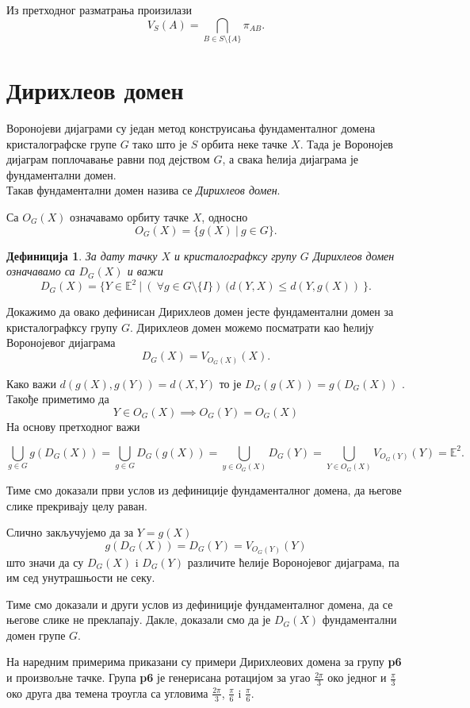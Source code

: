 \documentclass[12pt]{report}
\newtheorem{definition}[theorem]{\bf Дефиниција}
\begin{document}
Из претходног разматрања произилази
$$V_S(A) = \bigcap _{B \in S \setminus \{A\}} \pi_{AB}.$$ 

\section{Дирихлеов домен}

Воронојеви дијаграми су један метод конструисања фундаменталног домена кристалографске групе $G$ тако што је $S$ орбита неке тачке $X$. Тада је Воронојев дијаграм поплочавање равни под дејством $G$, а свака ћелија дијаграма је фундаментални домен. \\
Такав фундаментални домен назива се \emph{Дирихлеов домен}.

Са $O_G(X)$ означавамо орбиту тачке $X$, односно
$$O_G(X) = \{g(X)\:|\:g \in G\} .$$

\begin{definition}
За дату тачку $X$ и кристалографксу групу $G$ Дирихлеов домен означавамо са $D_G(X)$ и важи
$$D_G(X) = \{Y \in \mathbb{E}^2\:|\:(\:\forall g \in G \setminus \{I\})\:(d(Y,X)\leq d(Y,g(X))\:\}.$$
\end{definition}

\noindent  Докажимо да овако дефинисан Дирихлеов домен јесте фундаментални домен за кристалографксу групу $G$.
Дирихлеов домен можемо посматрати као ћелију Воронојевог дијаграма 
$$D_G(X)= V_{O_G(X)}(X).$$

\noindent Како важи $d(g(X), g(Y))= d(X,Y)$ то је  $D_G(g(X)) = g(D_G(X))$  .
Такође приметимо да $$Y \in  O_G(X) \implies O_G(Y) = O_G(X) $$
На основу претходног важи

$$\bigcup_{g\in G}g(D_G(X)) = \bigcup_{g\in G}D_G(g(X)) = \bigcup_{y \in O_G(X)}D_G(Y)
= \bigcup_{Y \in O_G(X)}V_{O_G(Y)}(Y) = \mathbb{E}^2.$$

\noindent Тиме смо доказали први услов из дефиниције фундаменталног домена, да његове слике прекривају целу раван.

\noindent Слично закључујемо да за $Y = g(X)$
$$g(D_G(X)) = D_G(Y) = V_{O_G(Y)}(Y)$$ што значи да су $D_G(X)$ i $D_G(Y)$ различите ћелије Воронојевог дијаграма, па им сед унутрашњости не секу. 

Тиме смо доказали и други услов из дефиниције фундаменталног домена, да се његове слике не преклапају. Дакле, доказали смо да је $D_G(X)$ фундаментални домен групе $G$.

На наредним примерима приказани су примери Дирихлеових домена за групу \textbf{p6} и произвољне тачке. 
Група \textbf{p6} је генерисана ротацијом за угао \(\frac{2\pi}{3}\) око једног
и \(\frac{\pi}{3}\) око друга два темена троугла са угловима \(\frac{2\pi}{3}\), \(\frac{\pi}{6}\) i \(\frac{\pi}{6}\).
\end{document}
